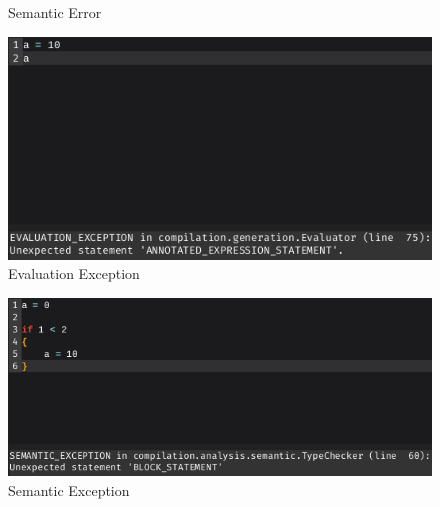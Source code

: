 \documentclass[
]{report}
\begin{document}
\begin{appendices}
\begin{figure}
		\caption{Semantic Error}
		\label{fig:semantic-error}
	\end{figure}
	\begin{figure}
		\centering
		\includegraphics[width=\textwidth]{evaluation-exception}
		\caption{Evaluation Exception}
		\label{fig:evaluation-exception}
	\end{figure}
	\begin{figure}
		\centering
		\includegraphics[width=\textwidth]{semantic-exception}
		\caption{Semantic Exception}
		\label{fig:semantic-exception}
	\end{figure}
\end{appendices}
\end{document}
